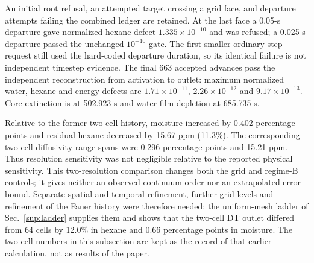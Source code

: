 An initial root refusal, an attempted target crossing a grid face, and
departure attempts failing the combined ledger are retained. At the last
face a 0.05-s departure gave normalized hexane defect
$1.335\times10^{-10}$ and was refused; a 0.025-s departure passed the
unchanged $10^{-10}$ gate. The first smaller ordinary-step request still
used the hard-coded departure duration, so its identical failure is not
independent timestep evidence. The final 663 accepted advances pass the
independent reconstruction from activation to outlet: maximum normalized
water, hexane and energy defects are $1.71\times10^{-11}$,
$2.26\times10^{-12}$ and $9.17\times10^{-13}$. Core extinction is at
502.923 s and water-film depletion at 685.735 s.

Relative to the former two-cell history, moisture increased by 0.402 percentage
points and residual hexane decreased by 15.67 ppm (11.3\%). The corresponding
two-cell diffusivity-range spans were 0.296 percentage points and 15.21 ppm.
Thus resolution sensitivity was not negligible relative to the reported
physical sensitivity. This two-resolution comparison changes both the grid
and regime-B controls; it gives neither an observed continuum order nor
an extrapolated error bound. Separate spatial and temporal refinement,
further grid levels and refinement of the Faner history were therefore
needed; the uniform-mesh ladder of Sec.~\ref{sup:ladder} supplies them
and shows that the two-cell DT outlet differed from 64 cells by 12.0\% in
hexane and 0.66 percentage points in moisture. The two-cell numbers in
this subsection are kept as the record of that earlier calculation, not
as results of the paper.


